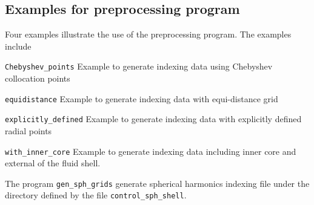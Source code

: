\subsection{Examples for preprocessing program}
Four examples illustrate the use of the preprocessing program. The examples include
%
\begin{description}
\item{\tt Chebyshev\_points} \label{href_t:gen_Chebyshev} Example to generate indexing data using Chebyshev collocation points
\item{\tt equidistance} \label{href_t:gen_equidistance} Example to generate indexing data with equi-distance grid
\item{\tt explicitly\_defined} \label{href_t:gen_explicit} Example to generate indexing data with explicitly defined radial points
\item{\tt with\_inner\_core} \label{href_t:gen_w_innercore} Example to generate indexing data including inner core and external of the fluid shell.
\end{description}

The program \verb|gen_sph_grids| generate spherical harmonics indexing file under the directory defined by the file \verb|control_sph_shell|.
%
